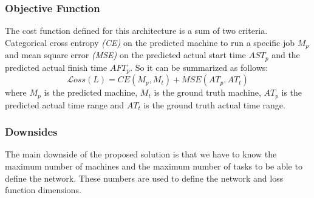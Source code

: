 \subsubsection{Objective Function}
The cost function defined for this architecture is a sum of two criteria. Categorical cross entropy \emph{(CE)} on the predicted machine to run a specific job $M_p$ and mean square error \emph{(MSE)} on the predicted actual start time $AST_p$ and the predicted actual finish time $AFT_p$. So it can be summarized as follows:
\begin{equation}
\mathcal Loss(L) = CE(M_p, M_t) + MSE(AT_p, AT_t) \label{eq:l}
\end{equation}
where $M_p$ is the predicted machine, $M_t$ is the ground truth machine, $AT_p$ is the predicted actual time range and $AT_t$ is the ground truth actual time range. \\

\subsubsection{Downsides}
The main downside of the proposed solution is that we have to know the maximum number of machines and the maximum number of tasks to be able to define the network. These numbers are used to define the network and loss function dimensions. 